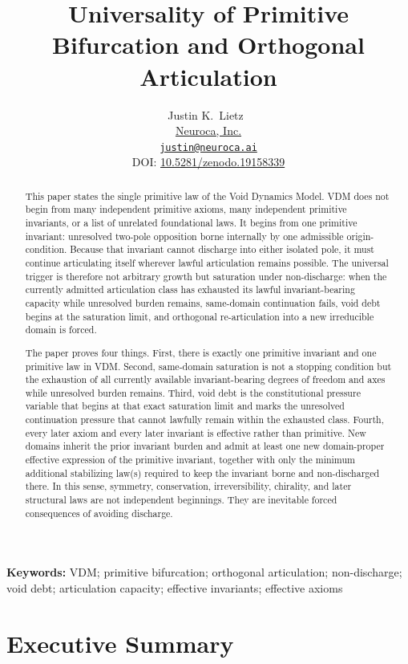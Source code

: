 \documentclass[11pt]{article}
\title{Universality of Primitive Bifurcation and Orthogonal Articulation}
\author{Justin K.\ Lietz~\orcidicon{0009-0008-9028-1366}\\
\href{https://www.neuroca.ai}{Neuroca, Inc.}\\
\texttt{\href{justin@neuroca.ai}{justin@neuroca.ai}}\\
DOI: \href{https://doi.org/10.5281/zenodo.19158339}{10.5281/zenodo.19158339}}
\theoremstyle{definition}
\theoremstyle{plain}
\theoremstyle{remark}
\providecommand{\keywords}[1]{\par\noindent\textbf{Keywords: }#1\par}
\begin{document}
\maketitle

\begin{abstract}
This paper states the single primitive law of the Void Dynamics Model. VDM does not begin from many independent primitive axioms, many independent primitive invariants, or a list of unrelated foundational laws. It begins from one primitive invariant: unresolved two-pole opposition borne internally by one admissible origin-condition. Because that invariant cannot discharge into either isolated pole, it must continue articulating itself wherever lawful articulation remains possible. The universal trigger is therefore not arbitrary growth but saturation under non-discharge: when the currently admitted articulation class has exhausted its lawful invariant-bearing capacity while unresolved burden remains, same-domain continuation fails, void debt begins at the saturation limit, and orthogonal re-articulation into a new irreducible domain is forced.

The paper proves four things. First, there is exactly one primitive invariant and one primitive law in VDM. Second, same-domain saturation is not a stopping condition but the exhaustion of all currently available invariant-bearing degrees of freedom and axes while unresolved burden remains. Third, void debt is the constitutional pressure variable that begins at that exact saturation limit and marks the unresolved continuation pressure that cannot lawfully remain within the exhausted class. Fourth, every later axiom and every later invariant is effective rather than primitive. New domains inherit the prior invariant burden and admit at least one new domain-proper effective expression of the primitive invariant, together with only the minimum additional stabilizing law(s) required to keep the invariant borne and non-discharged there. In this sense, symmetry, conservation, irreversibility, chirality, and later structural laws are not independent beginnings. They are inevitable forced consequences of avoiding discharge.
\end{abstract}

\keywords{VDM; primitive bifurcation; orthogonal articulation; non-discharge; void debt; articulation capacity; effective invariants; effective axioms}

\tableofcontents
\newpage

\section{Executive Summary}
\end{document}
